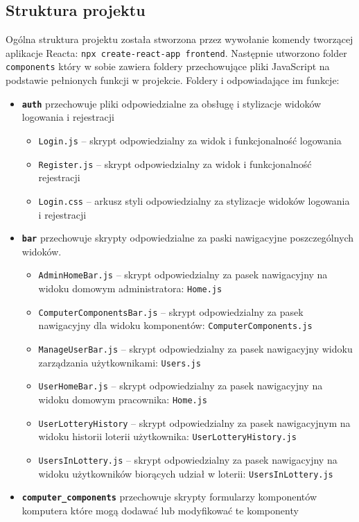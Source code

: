 \subsection{Struktura projektu}
Ogólna struktura projektu została stworzona przez wywołanie komendy tworzącej aplikacje Reacta: \texttt{npx create-react-app frontend}. Następnie utworzono folder \texttt{components} który w sobie zawiera foldery przechowujące pliki JavaScript na podstawie pełnionych funkcji w projekcie. Foldery i odpowiadające im funkcje: 
\begin {itemize}
\item \texttt{\textbf{auth}} przechowuje pliki odpowiedzialne za obsługę i stylizacje widoków logowania i rejestracji
	\begin{itemize}
	\item \texttt{Login.js} -- skrypt odpowiedzialny za widok i funkcjonalność logowania
	\item \texttt{Register.js} -- skrypt odpowiedzialny za widok i funkcjonalność rejestracji
	\item \texttt{Login.css} -- arkusz styli odpowiedzialny za stylizacje widoków logowania i rejestracji
	\end{itemize}
\item \texttt{\textbf{bar}} przechowuje skrypty odpowiedzialne za paski nawigacyjne poszczególnych widoków.
	\begin{itemize}
	\item \texttt{AdminHomeBar.js} -- skrypt odpowiedzialny za pasek nawigacyjny na widoku domowym administratora: \texttt{Home.js}
	\item \texttt{ComputerComponentsBar.js} -- skrypt odpowiedzialny za pasek nawigacyjny dla widoku komponentów: \texttt{ComputerComponents.js}
	\item \texttt{ManageUserBar.js} -- skrypt odpowiedzialny za pasek nawigacyjny widoku zarządzania użytkownikami: \texttt{Users.js}
	\item \texttt{UserHomeBar.js} -- skrypt odpowiedzialny za pasek nawigacyjny na widoku domowym pracownika: \texttt{Home.js}
	\item \texttt{UserLotteryHistory} -- skrypt odpowiedzialny za pasek nawigacyjnym na widoku historii loterii użytkownika: \texttt{UserLotteryHistory.js}
	\item \texttt{UsersInLottery.js} -- skrypt odpowiedzialny za pasek nawigacyjny na widoku użytkowników biorących udział w loterii: \texttt{UsersInLottery.js}
	\end{itemize}
\item \texttt{\textbf{computer\_components}} przechowuje skrypty formularzy komponentów komputera które mogą dodawać lub modyfikować te komponenty

\end{itemize}
